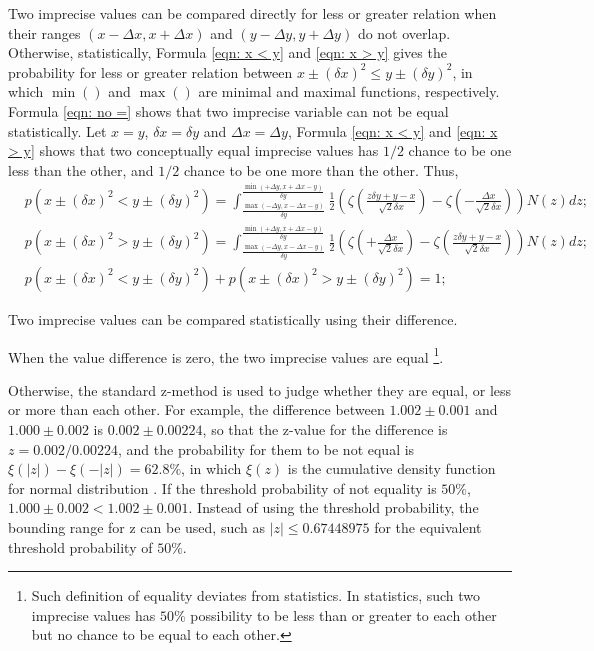 \documentclass[twoside]{article}
\numberwithin{equation}{section}
\begin{document}
Two imprecise values can be compared directly for less or greater relation when their ranges $(x - \Delta x, x + \Delta x)$ and $(y - \Delta y, y + \Delta y)$ do not overlap. 
Otherwise, statistically, Formula \eqref{eqn: x < y} and \eqref{eqn: x > y} gives the probability for less or greater relation between $x \pm (\delta x)^2 \le y \pm (\delta y)^2$, in which $\min()$ and $\max()$ are minimal and maximal functions, respectively.
Formula \eqref{eqn: no =} shows that two imprecise variable can not be equal statistically.
Let $x = y$, $\delta x = \delta y$ and $\Delta x = \Delta y$, Formula \eqref{eqn: x < y} and \eqref{eqn: x > y} shows that two conceptually equal imprecise values has $1/2$ chance to be one less than the other, and $1/2$ chance to be one more than the other.
Thus,
\begin{align}
\label{eqn: x < y}
& p\left( x \pm (\delta x)^2 < y \pm (\delta y)^2 \right) = 
  \int_{\frac{\max(-\Delta y, x - \Delta x - y)}{\delta y}}^{\frac{\min(+\Delta y, x + \Delta x - y)}{\delta y}} 
      \frac{1}{2} \left(\zeta(\frac{z \delta y + y - x}{\sqrt{2} \delta x}) - \zeta(-\frac{\Delta x}{\sqrt{2} \delta x})\right) N(z) d z; \\
\label{eqn: x > y}
& p\left( x \pm (\delta x)^2 > y \pm (\delta y)^2 \right) =     
  \int_{\frac{\max(-\Delta y, x - \Delta x - y)}{\delta y}}^{\frac{\min(+\Delta y, x + \Delta x - y)}{\delta y}} 
      \frac{1}{2} \left(\zeta(+\frac{\Delta x}{\sqrt{2} \delta x}) - \zeta(\frac{z \delta y + y - x}{\sqrt{2} \delta x})\right) N(z) d z; \\
\label{eqn: no =}
& p\left( x \pm (\delta x)^2 < y \pm (\delta y)^2 \right) + p\left( x \pm (\delta x)^2 > y \pm (\delta y)^2 \right) = 1;
\end{align}

\fi

Two imprecise values can be compared statistically using their difference.

When the value difference is zero, the two imprecise values are equal
\footnote{
Such definition of equality deviates from statistics.
In statistics, such two imprecise values has $50\%$ possibility to be less than or greater to each other but no chance to be equal to each other.
}.  

Otherwise, the standard z-method \cite{Probability_Statistics} is used to judge whether they are equal, or less or more than each other.
For example, the difference between $1.002 \pm 0.001$ and $1.000 \pm 0.002$ is $0.002 \pm 0.00224$, so that the z-value for the difference is $z = 0.002 / 0.00224$, and the probability for them to be not equal is $\xi(|z|) - \xi(-|z|) = 62.8\%$, in which $\xi(z)$ is the cumulative density function for normal distribution \cite{Probability_Statistics}.
If the threshold probability of not equality is $50\%$, $1.000 \pm 0.002 < 1.002 \pm 0.001$.
Instead of using the threshold probability, the bounding range for z can be used, such as $|z| \leq 0.67448975$ for the equivalent threshold probability of $50\%$.
\end{document}
